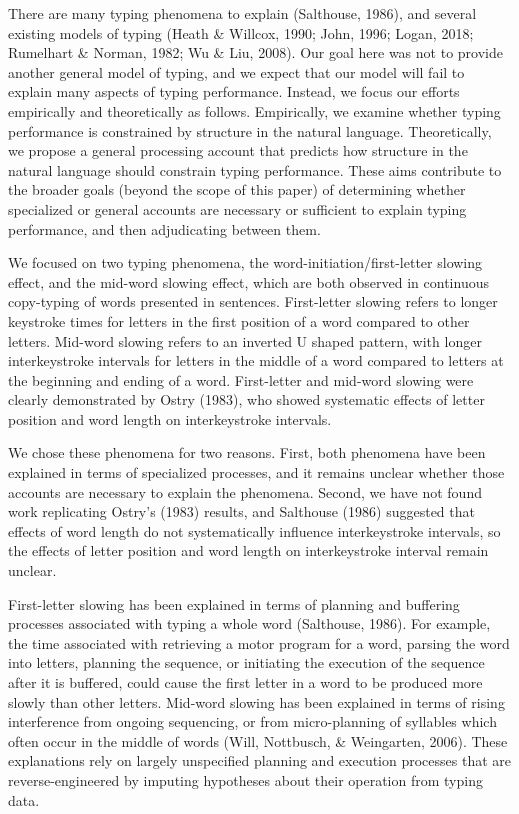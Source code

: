 \documentclass[,man,floatsintext]{apa6}
\begin{document}
There are many typing phenomena to explain (Salthouse, 1986), and several existing models of typing (Heath \& Willcox, 1990; John, 1996; Logan, 2018; Rumelhart \& Norman, 1982; Wu \& Liu, 2008). Our goal here was not to provide another general model of typing, and we expect that our model will fail to explain many aspects of typing performance. Instead, we focus our efforts empirically and theoretically as follows. Empirically, we examine whether typing performance is constrained by structure in the natural language. Theoretically, we propose a general processing account that predicts how structure in the natural language should constrain typing performance. These aims contribute to the broader goals (beyond the scope of this paper) of determining whether specialized or general accounts are necessary or sufficient to explain typing performance, and then adjudicating between them.

We focused on two typing phenomena, the word-initiation/first-letter slowing effect, and the mid-word slowing effect, which are both observed in continuous copy-typing of words presented in sentences. First-letter slowing refers to longer keystroke times for letters in the first position of a word compared to other letters. Mid-word slowing refers to an inverted U shaped pattern, with longer interkeystroke intervals for letters in the middle of a word compared to letters at the beginning and ending of a word. First-letter and mid-word slowing were clearly demonstrated by Ostry (1983), who showed systematic effects of letter position and word length on interkeystroke intervals.

We chose these phenomena for two reasons. First, both phenomena have been explained in terms of specialized processes, and it remains unclear whether those accounts are necessary to explain the phenomena. Second, we have not found work replicating Ostry's (1983) results, and Salthouse (1986) suggested that effects of word length do not systematically influence interkeystroke intervals, so the effects of letter position and word length on interkeystroke interval remain unclear.

First-letter slowing has been explained in terms of planning and buffering processes associated with typing a whole word (Salthouse, 1986). For example, the time associated with retrieving a motor program for a word, parsing the word into letters, planning the sequence, or initiating the execution of the sequence after it is buffered, could cause the first letter in a word to be produced more slowly than other letters. Mid-word slowing has been explained in terms of rising interference from ongoing sequencing, or from micro-planning of syllables which often occur in the middle of words (Will, Nottbusch, \& Weingarten, 2006). These explanations rely on largely unspecified planning and execution processes that are reverse-engineered by imputing hypotheses about their operation from typing data.
\end{document}
